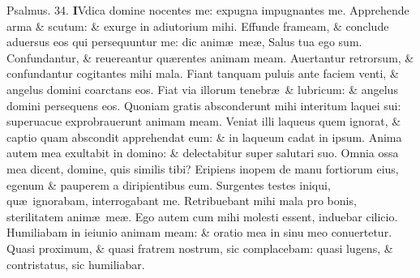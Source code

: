 \documentclass[a5paper,10pt]{book}
\def\ae{æ}
\begin{document}
\begin{multicols*}{2}
\newline \color{red} Psalmus. \hypertarget{ps34}{34.} \color{black}
\vspace{-.5em}
\lettrine[lines=2]{\bfseries \color{red} I}{}Vdica domine nocentes me: expugna impugnantes me.
\newline \color{red} A\color{black}pprehende arma \& scutum: \& exurge in adiutorium mihi.
\newline \color{red} E\color{black}ffunde frameam, \& conclude aduersus eos qui persequuntur me: dic anim\ae \ me\ae , Salus tua ego sum.
\newline \color{red} C\color{black}onfundantur, \& reuereantur qu\ae rentes animam meam.
\newline \color{red} A\color{black}uertantur retrorsum, \& confundantur cogitantes mihi mala.
\newline \color{red} F\color{black}iant tanquam puluis ante faciem venti, \& angelus domini coarctans eos.
\newline \color{red} F\color{black}iat via illorum tenebr\ae \ \& lubricum: \& angelus domini persequens eos.
\newline \color{red} Q\color{black}uoniam gratis absconderunt mihi interitum laquei sui: superuacue exprobrauerunt animam meam.
\newline \color{red} V\color{black}eniat illi laqueus quem ignorat, \& captio quam abscondit apprehendat eum: \& in laqueum cadat in ipsum.
\newline \color{red} A\color{black}nima autem mea exultabit in domino: \& delectabitur super salutari suo.
\newline \color{red} O\color{black}mnia ossa mea dicent, domine, quis similis tibi?
\newline \color{red} E\color{black}ripiens inopem de manu fortiorum eius, egenum \& pauperem a diripientibus eum.
\newline \color{red} S\color{black}urgentes testes iniqui, qu\ae \ ignorabam, interrogabant me.
\newline \color{red} R\color{black}etribuebant mihi mala pro bonis, sterilitatem anim\ae \ me\ae .
\newline \color{red} E\color{black}go autem cum mihi molesti essent, induebar cilicio.
\newline \color{red} H\color{black}umiliabam in ieiunio animam meam: \& oratio mea in sinu meo conuertetur.
\newline \color{red} Q\color{black}uasi proximum, \& quasi fratrem nostrum, sic complacebam: quasi lugens, \& contristatus, sic humiliabar.

\end{multicols*}
\end{document}
